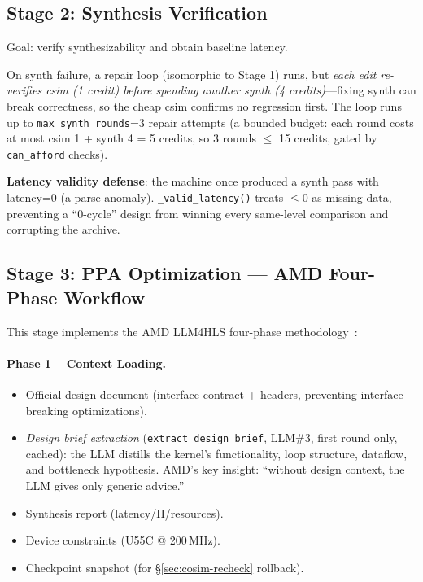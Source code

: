 \documentclass[10pt,conference,letterpaper]{IEEEtran}
\begin{document}
\subsection{Stage 2: Synthesis Verification}

Goal: verify synthesizability and obtain baseline latency.

On synth failure, a repair loop (isomorphic to Stage 1) runs, but \emph{each edit re-verifies csim (1 credit) before spending another synth (4 credits)}---fixing synth can break correctness, so the cheap csim confirms no regression first. The loop runs up to \texttt{max\_synth\_rounds}=3 repair attempts (a bounded budget: each round costs at most csim 1 + synth 4 = 5 credits, so 3 rounds $\leq$ 15 credits, gated by \texttt{can\_afford} checks).

\textbf{Latency validity defense}: the machine once produced a synth pass with latency=0 (a parse anomaly). \texttt{\_valid\_latency()} treats $\leq 0$ as missing data, preventing a ``0-cycle'' design from winning every same-level comparison and corrupting the archive.

\subsection{Stage 3: PPA Optimization --- AMD Four-Phase Workflow}
\label{sec:optimize}

This stage implements the AMD LLM4HLS four-phase methodology~\cite{amdllm4hls}:

\paragraph{Phase 1 -- Context Loading.}
\begin{itemize}
    \item Official design document (interface contract + headers, preventing interface-breaking optimizations).
    \item \emph{Design brief extraction} (\texttt{extract\_design\_brief}, LLM\#3, first round only, cached): the LLM distills the kernel's functionality, loop structure, dataflow, and bottleneck hypothesis. AMD's key insight: ``without design context, the LLM gives only generic advice.''
    \item Synthesis report (latency/II/resources).
    \item Device constraints (U55C @ 200\,MHz).
    \item Checkpoint snapshot (for \S\ref{sec:cosim-recheck} rollback).
\end{itemize}
\end{document}
